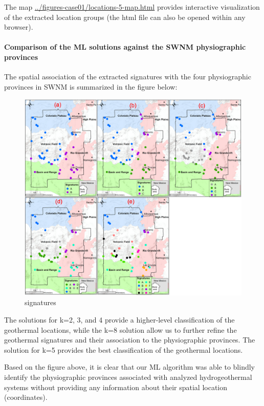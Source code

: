 \documentclass[11pt]{article}
\begin{document}
The map \url{../figures-case01/locations-5-map.html} provides
interactive visualization of the extracted location groups (the html
file can also be opened within any browser).

    \hypertarget{comparison-of-the-ml-solutions-against-the-swnm-physiographic-provinces}{%
\paragraph{Comparison of the ML solutions against the SWNM physiographic
provinces}\label{comparison-of-the-ml-solutions-against-the-swnm-physiographic-provinces}}

The spatial association of the extracted signatures with the four
physiographic provinces in SWNM is summarized in the figure below:

\begin{figure}
\centering
\includegraphics{../figures-case01/signatures.png}
\caption{signatures}
\end{figure}

The solutions for k=2, 3, and 4 provide a higher-level classification of
the geothermal locations, while the k=8 solution allow us to further
refine the geothermal signatures and their association to the
physiographic provinces. The solution for k=5 provides the best
classification of the geothermal locations.

Based on the figure above, it is clear that our ML algorithm was able to
blindly identify the physiographic provinces associated with analyzed
hydrogeothermal systems without providing any information about their
spatial location (coordinates).
\end{document}
